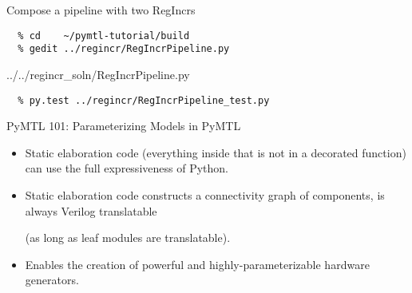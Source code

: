 \begin{task}\begin{frame}[fragile]{Compose a pipeline with two RegIncrs}
\vspace{-0.25in}
\begin{verbatim}
  % cd    ~/pymtl-tutorial/build
  % gedit ../regincr/RegIncrPipeline.py
\end{verbatim}

\vspace{-0.3in}
%
{../../regincr_soln/RegIncrPipeline.py}

\vspace{-0.3in}
\begin{verbatim}
  % py.test ../regincr/RegIncrPipeline_test.py
\end{verbatim}
\end{frame}
\end{task}

\begin{frame}{PyMTL 101: Parameterizing Models in PyMTL}
\begin{itemize}
  \item Static elaboration code (everything inside  that
        is not in a decorated function) can use the full expressiveness of
        Python.
  \smallskip
  \item Static elaboration code constructs a connectivity graph of
        components, is always Verilog translatable

        (as long as leaf modules are translatable).
  \smallskip
  \item Enables the creation of powerful and highly-parameterizable
        hardware generators.
\end{itemize}
\end{frame}

